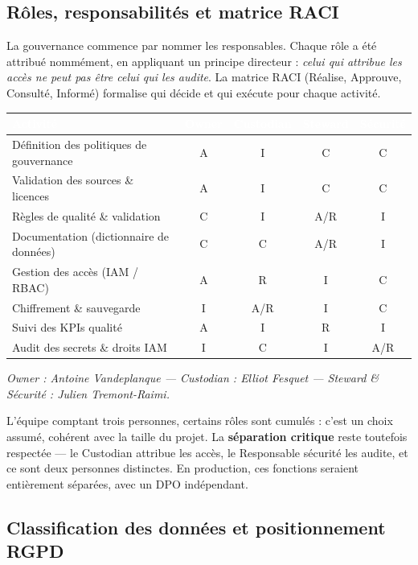 \documentclass[11pt]{article}
\newcommand{\thead}[1]{\textbf{\textcolor{white}{#1}}}
\begin{document}
\subsection{Rôles, responsabilités et matrice RACI}

La gouvernance commence par nommer les responsables. Chaque rôle a été attribué
nommément, en appliquant un principe directeur : \emph{celui qui attribue les accès
ne peut pas être celui qui les audite}. La matrice RACI (Réalise, Approuve, Consulté,
Informé) formalise qui décide et qui exécute pour chaque activité.

\begin{center}
\begin{tabularx}{\linewidth}{@{}>{\raggedright\arraybackslash}X cccc@{}}
\toprule
\rowcolor{tableHeader}
\thead{Activité} & \thead{Owner} & \thead{Custodian} & \thead{Steward} & \thead{Sécurité} \\
\midrule
Définition des politiques de gouvernance & A & I & C & C \\
Validation des sources \& licences & A & I & C & C \\
Règles de qualité \& validation & C & I & A/R & I \\
Documentation (dictionnaire de données) & C & C & A/R & I \\
Gestion des accès (IAM / RBAC) & A & R & I & C \\
Chiffrement \& sauvegarde & I & A/R & I & C \\
Suivi des KPIs qualité & A & I & R & I \\
Audit des secrets \& droits IAM & I & C & I & A/R \\
\bottomrule
\end{tabularx}

{\small\textit{Owner : Antoine Vandeplanque --- Custodian : Elliot Fesquet ---
Steward \& Sécurité : Julien Tremont-Raimi.}}
\end{center}

L'équipe comptant trois personnes, certains rôles sont cumulés : c'est un choix
assumé, cohérent avec la taille du projet. La \textbf{séparation critique} reste
toutefois respectée --- le Custodian attribue les accès, le Responsable sécurité les
audite, et ce sont deux personnes distinctes. En production, ces fonctions seraient
entièrement séparées, avec un DPO indépendant.

\subsection{Classification des données et positionnement RGPD}
\end{document}
